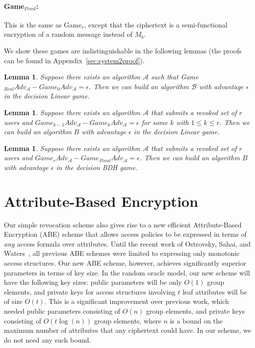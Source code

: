 \documentclass[a4paper, 11pt]{article}
\newtheorem{lemma}[theorem]{Lemma}
\newtheorem{lemma}[theorem]{Lemma}
\theoremstyle{definition}
\begin{document}
\paragraph{Game$_{Final}$:} This is the same as Game$_r$, except that the ciphertext is a semi-functional encryption of a random message instead of $M_b$.

We show these games are indistinguishable in the following lemmas (the proofs can be found in Appendix~\ref{sec:system2proof}).

\begin{lemma}Suppose there exists an algorithm $\mathcal{A}$ such that Game$_{Real}Adv_{\mathcal{A}} - Game_0 Adv_{\mathcal{A}} = \epsilon$. Then we can build an algorithm $\mathcal{B}$ with advantage $\epsilon$ in the decision Linear game.
\end{lemma}


\begin{lemma} Suppose there exists an algorithm $\mathcal{A}$ that submits a revoked set of $r$ users and $Game_{k-1}Adv_{\mathcal{A}} - Game_k Adv_{\mathcal{A}} = \epsilon$ for some $k$ with $1 \leq k \leq r$. Then we can build an algorithm $B$ with advantage $\epsilon$ in the decision Linear game.
\end{lemma}

\begin{lemma} Suppose there exists an algorithm $\mathcal{A}$ that submits a revoked set of $r$ users and $Game_{r}Adv_{\mathcal{A}} - Game_{Final} Adv_{\mathcal{A}} = \epsilon$. Then we can build an algorithm $B$ with advantage $\epsilon$ in the decision BDH game.
\end{lemma}



\section{Attribute-Based Encryption}
\label{sec:ABE}

Our simple revocation scheme also
gives rise to a new efficient Attribute-Based Encryption (ABE) scheme
that allows access policies to be expressed in terms of \emph{any}
access formula over attributes. Until the recent work of Ostrovsky,
Sahai, and Waters~\cite{OSW07}, all previous ABE schemes were limited to expressing
only monotonic access structures.  Our new ABE scheme, however,
achieves significantly superior parameters in terms of key size.  In
the random oracle model, our new scheme will have the following key
sizes: public parameters will be only $O(1)$ group elements, and
private keys for access structures involving $t$ leaf attributes will
be of size $O(t)$.  This is a significant improvement over previous
work, which needed public parameters consisting of $O(n)$ group
elements, and private keys consisting of $O(t \log(n))$ group
elements, where $n$ is a bound on the maximum number of attributes
that any ciphertext could have.  In our scheme, we do not need any
such bound.
\end{document}
